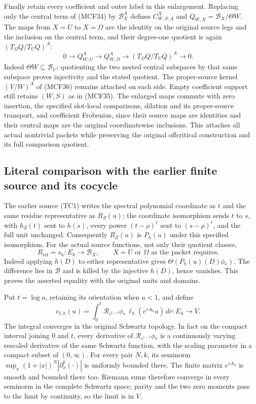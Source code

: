 Finally retain every coefficient and outer label in this enlargement.
Replacing only the central term of (MCF34) by $\mathscr B_X^A$
defines $C^X_{W,S;A}$ and $Q_{W,X}=\mathscr B_X/\Theta W$.
The maps from $X=U$ to $X=\Omega$ are the identity on the original
source legs and the inclusion on the central term, and their
degree-one quotient is again $(T_\Omega Q/T_UQ)^A$:
\[
0\longrightarrow Q_{W,U}^A\longrightarrow Q_{W,\Omega}^A
  \longrightarrow (T_\Omega Q/T_UQ)^A\longrightarrow0.
\tag{MCF41g}
\]
Indeed $\Theta W\subseteq\mathscr B_U$; quotienting the two nested
central subspaces by that same subspace proves injectivity and the
stated quotient.  The proper-source kernel $(V/W)^A$ of (MCF36)
remains attached on each side.  Empty coefficient support still
retains $(W,S)$ as in (MCF35).  The enlarged maps commute with zero
insertion, the specified slot-local comparisons, dilation and its
proper-source transport, and coefficient Frobenius, since their
source maps are identities and their central maps are the original
coordinatewise inclusions.  This attaches all actual nontrivial
packets while preserving the original offcritical construction and
its full comparison quotient.

\subsection{Literal comparison with the earlier finite source and its cocycle}

The earlier source (TC1) writes the spectral polynomial coordinate as
$t$ and the same residue representative as $R_Z(u)$; the coordinate
isomorphism sends $t$ to $s$, with $h_Z(t)$ sent to $h(s)$, every
power $(t-\rho)^r$ sent to $(s-\rho)^r$, and the full unit unchanged.
Consequently $R_Z(u)$ is $P_h(u)$ under this specified isomorphism.
For the actual source functions, not only their quotient classes,
\[
R_{\mathrm{ref}}=s_h:E_h\longrightarrow\mathscr B_X,
\qquad X=U\text{ or }\Omega\text{ as the packet requires}.
\tag{MCF42}
\]
Indeed applying $h(D)$ to either representative gives
$\Theta(P_h(u)(D)\phi_*)$.  The difference lies in $\mathscr B$
and is killed by the injective $h(D)$, hence vanishes.  This proves
the asserted equality with the original units and domains.

Put $t=\log a$, retaining its orientation when $a<1$, and define
\[
c_{t,h}(u)=\int_0^t\mathcal R_{e^{t-r}}\phi_*\,
                  \ell_h(e^{rA_h}u)\,dr:E_h\longrightarrow V.
\tag{MCF43}
\]
The integral converges in the original Schwartz topology.  In fact
on the compact interval joining $0$ and $t$, every derivative of
$\mathcal R_{e^{t-r}}\phi_*$ is a continuously varying rescaled
derivative of the same Schwartz function, with the scaling parameter
in a compact subset of $(0,\infty)$.  For every pair $N,k$, its
seminorm $\sup_x(1+|x|)^N|\partial_x^k(\cdot)|$ is uniformly
bounded there.  The finite matrix $e^{rA_h}$ is smooth and bounded
there too.  Riemann sums therefore converge in every seminorm in
the complete Schwartz space; parity and the two zero moments pass
to the limit by continuity, so the limit is in $V$.


